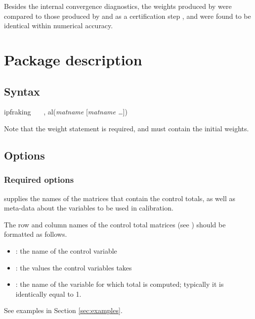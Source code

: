 Besides the internal convergence diagnostics, the weights produced by 
were compared to those produced by  and 
as a certification step \citep{gould:2001}, and were found to be identical
within numerical accuracy.

\section{Package description}

\subsection{Syntax}
\label{subsec:syntax}

\begin{stsyntax}
ipfraking
\optif\
\optin\
\optweight\
,
al({\it matname} [{\it matname \ldots}])
\end{stsyntax}

\hangpara
Note that the weight statement \stcmd{[pw=\varname]} is required, and must contain the initial weights.

\subsection{Options}

\subsubsection{Required options}

\hangpara
{} \RB\stcmd{)}
supplies the names of the matrices that contain the control
totals, as well as meta-data about the variables to be used
in calibration.

\begin{sttech}
The row and column names of the control total matrices
(see ) should be formatted as follows.
\begin{itemize}
    \item \stcmd{rownames}: the name of the control variable
    \item \stcmd{colnames}: the values the control variables takes
    \item {}: the name of the variable for which total is computed;
          typically it is identically equal to 1.
\end{itemize}
See examples in Section \ref{sec:examples}.
\end{sttech}

